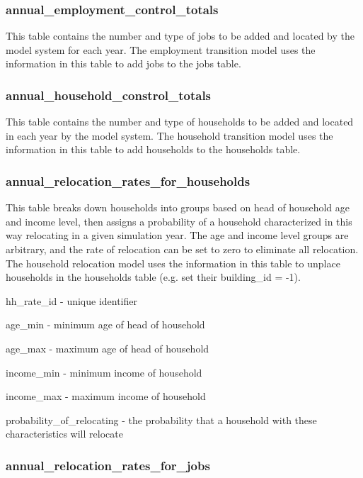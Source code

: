 \subsubsection{annual\_employment\_control\_totals} 

This table contains the number and type of jobs to be added and located by the model system for each year.  The employment transition model uses the information in this table to add jobs to the jobs table.

\subsubsection{annual\_household\_constrol\_totals}

This table contains the number and type of households to be added and located in each year by the model system.  The household transition model uses the information in this table to add households to the households table.

\subsubsection{annual\_relocation\_rates\_for\_households} 

This table breaks down households into groups based on head of household age and income level, then assigns a probability of a household characterized in this way relocating in a given simulation year. The age and income level groups are arbitrary, and the rate of relocation can be set to zero to eliminate all relocation.  The household relocation model uses the information in this table to unplace households in the households table (e.g. set their building_id = -1).

\begin{description}
\item hh\_rate\_id - unique identifier
\item age\_min - minimum age of head of household
\item age\_max - maximum age of head of household
\item income\_min - minimum income of household
\item income\_max - maximum income of household
\item probability\_of\_relocating - the probability that a household with these characteristics will relocate 
\end{description}

\subsubsection{annual\_relocation\_rates\_for\_jobs} 

